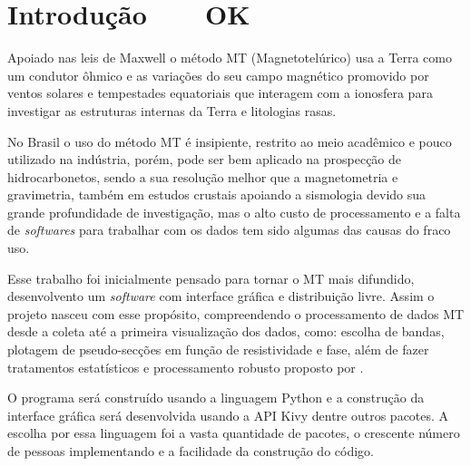 

\chapter{Introdução \,\,\,\,\,\,\,\,\ OK}
    \label{cap-introducao}
    
	Apoiado nas leis de Maxwell o método MT (Magnetotelúrico) usa a Terra como 
	um condutor ôhmico e as variações do seu campo 
	magnético promovido por ventos solares \cite{parkinson93} e tempestades equatoriais 
	que interagem com a ionosfera para investigar as 
	estruturas internas da Terra e litologias rasas. 
	
	
	No Brasil o uso do método MT é insipiente, restrito ao meio acadêmico e pouco
	utilizado na indústria, porém, pode ser bem aplicado na prospecção de 
	hidrocarbonetos, sendo a sua resolução melhor que a magnetometria
	e gravimetria, também em estudos crustais
	apoiando a sismologia devido sua grande profundidade de investigação, mas o 
	alto custo de processamento e a falta de \textit{softwares} para trabalhar com os 
	dados tem sido algumas das causas do fraco uso.
	
	
	Esse trabalho foi inicialmente pensado para tornar o MT mais difundido, 
	desenvolvento um \textit{software} com interface gráfica e 
	distribuição livre. Assim o projeto nasceu 
	com esse propósito, compreendendo o processamento de dados
	MT desde a coleta até a primeira visualização dos dados, como: escolha 
	de bandas, plotagem de pseudo-secções em função de resistividade e fase, além de fazer tratamentos estatísticos e processamento robusto 
	proposto por \citeauthor{egbert97} \citeyearpar{egbert97}.
	
	
	O programa será construído usando a linguagem Python \cite{python36} 
	e a construção da interface gráfica será desenvolvida usando a API
	Kivy \cite{kivy110} dentre outros pacotes. A escolha por essa linguagem foi a vasta quantidade de pacotes,  o crescente 
	número de pessoas implementando e a facilidade da construção do código.



